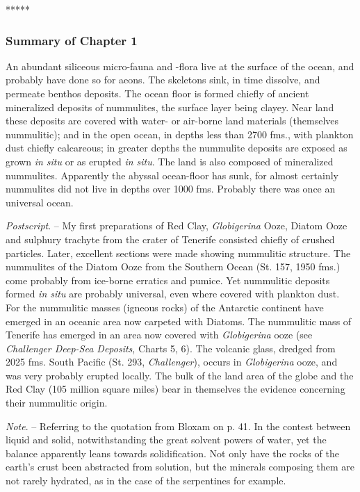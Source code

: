\documentclass[a4paper, 12pt, oneside]{article}
\begin{document}
\centerline{*\hspace{15mm}*\hspace{15mm}*\hspace{15mm}*\hspace{15mm}*}
\bigskip

\subsubsection{Summary of Chapter 1}

An abundant siliceous micro-fauna and -flora live at the surface of the ocean, and probably have done so for aeons. The skeletons sink, in time dissolve, and permeate benthos deposits. The ocean floor is formed chiefly of ancient mineralized deposits of nummulites, the surface layer being clayey. Near land these deposits are covered with water- or air-borne land materials (themselves nummulitic); and in the open ocean, in depths less than 2700 fms., with plankton dust chiefly calcareous; in greater depths the nummulite deposits are exposed as grown \emph{in situ} or as erupted \emph{in situ}. The land is also composed of mineralized nummulites. Apparently the abyssal ocean-floor has sunk, for almost certainly nummulites did not live in depths over 1000 fms. Probably there was once an universal ocean.

\emph{Postscript}. -- My first preparations of Red Clay, \emph{Globigerina} Ooze, Diatom Ooze and sulphury trachyte from the crater of Tenerife consisted chiefly of crushed particles. Later, excellent sections were made showing nummulitic structure. The nummulites of the Diatom Ooze from the Southern Ocean (St. 157, 1950 fms.) come probably from ice-borne erratics and pumice. Yet nummulitic deposits formed \emph{in situ} are probably universal, even where covered with plankton dust. For the nummulitic masses (igneous rocks) of the Antarctic continent have emerged in an oceanic area now carpeted with Diatoms. The nummulitic mass of Tenerife has emerged in an area now covered with \emph{Globigerina} ooze (see \emph{Challenger Deep-Sea Deposits}, Charts 5, 6). The volcanic glass, dredged from 2025 fms. South Pacific (St. 293, \emph{Challenger}), occurs in \emph{Globigerina} ooze, and was very probably erupted locally. The bulk of the land area of the globe and the Red Clay (105 million square miles) bear in themselves the evidence concerning their nummulitic origin.

\emph{Note}. -- Referring to the quotation from Bloxam on p. 41. In the contest between liquid and solid, notwithstanding the great solvent powers of water, yet the balance apparently leans towards solidification. Not only have the rocks of the earth's crust been abstracted from solution, but the minerals composing them are not rarely hydrated, as in the case of the serpentines for example.
\clearpage
\end{document}
